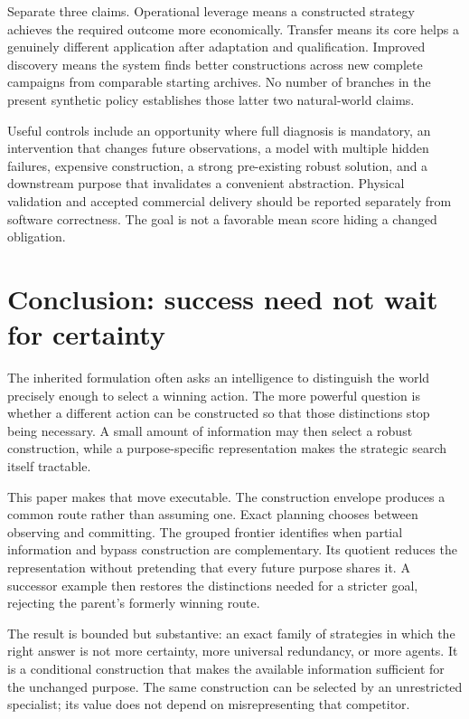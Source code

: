 \documentclass[11pt,letterpaper]{article}
\theoremstyle{remark}\newtheorem{remark}{Remark}[section]
\begin{document}
Separate three claims. Operational leverage means a constructed strategy achieves the required outcome more economically. Transfer means its core helps a genuinely different application after adaptation and qualification. Improved discovery means the system finds better constructions across new complete campaigns from comparable starting archives. No number of branches in the present synthetic policy establishes those latter two natural-world claims.

Useful controls include an opportunity where full diagnosis is mandatory, an intervention that changes future observations, a model with multiple hidden failures, expensive construction, a strong pre-existing robust solution, and a downstream purpose that invalidates a convenient abstraction. Physical validation and accepted commercial delivery should be reported separately from software correctness. The goal is not a favorable mean score hiding a changed obligation.

\section{Conclusion: success need not wait for certainty}
The inherited formulation often asks an intelligence to distinguish the world precisely enough to select a winning action. The more powerful question is whether a different action can be constructed so that those distinctions stop being necessary. A small amount of information may then select a robust construction, while a purpose-specific representation makes the strategic search itself tractable.

This paper makes that move executable. The construction envelope produces a common route rather than assuming one. Exact planning chooses between observing and committing. The grouped frontier identifies when partial information and bypass construction are complementary. Its quotient reduces the representation without pretending that every future purpose shares it. A successor example then restores the distinctions needed for a stricter goal, rejecting the parent's formerly winning route.

The result is bounded but substantive: an exact family of strategies in which the right answer is not more certainty, more universal redundancy, or more agents. It is a conditional construction that makes the available information sufficient for the unchanged purpose. The same construction can be selected by an unrestricted specialist; its value does not depend on misrepresenting that competitor.
\end{document}
